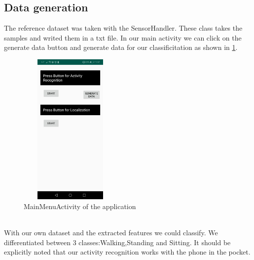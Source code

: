 \documentclass[conference]{IEEEtran}
\begin{document}
\subsection{Data generation}
The reference dataset was  taken with the SensorHandler. These class takes the samples and writed them in a txt file. In our main activity we can click on the generate data button and generate data for our classificitation as shown in 
\ref{fig:mainmenuactivity}. \\ 
\begin{figure}
\includegraphics[height = 7.5cm,width = 5cm]{Images/MainActivity.jpeg}
\centering
\caption{MainMenuActivity of the application}
\label{fig:mainmenuactivity}
\end{figure}\\
With our own dataset and the extracted features we could classify. We differentiated between 3 classes:Walking,Standing and Sitting. It should be explicitly noted that our activity recognition works with the phone in the pocket. 
\end{document}
